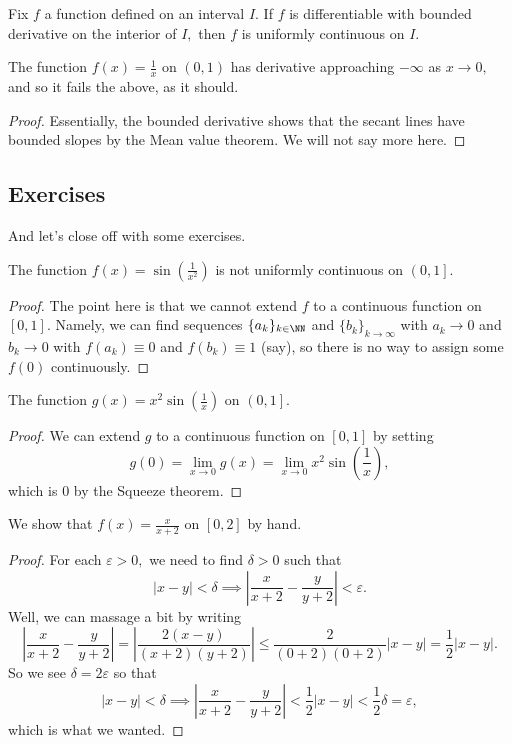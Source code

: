 \documentclass[../notes.tex]{subfiles}
\begin{document}
\begin{proposition}
	Fix $f$ a function defined on an interval $I.$ If $f$ is differentiable with bounded derivative on the interior of $I,$ then $f$ is uniformly continuous on $I.$
\end{proposition}
\begin{nex}
	The function $f(x)=\frac1x$ on $(0,1)$ has derivative approaching $-\infty$ as $x\to0,$ and so it fails the above, as it should.
\end{nex}
\begin{proof}
	Essentially, the bounded derivative shows that the secant lines have bounded slopes by the Mean value theorem. We will not say more here.
\end{proof}

\subsection{Exercises}
And let's close off with some exercises.
\begin{exercise}[Ross 19.1(f)]
	The function $f(x)=\sin\left(\frac1{x^2}\right)$ is not uniformly continuous on $\left(0,1\right].$
\end{exercise}
\begin{proof}
	The point here is that we cannot extend $f$ to a continuous function on $[0,1].$ Namely, we can find sequences $\{a_k\}_{k\in\NN}$ and $\{b_k\}_{k\to\infty}$ with $a_k\to0$ and $b_k\to0$ with $f(a_k)\equiv0$ and $f(b_k)\equiv1$ (say), so there is no way to assign some $f(0)$ continuously.
\end{proof}
\begin{exercise}[Ross 19.1(g)]
	The function $g(x)=x^2\sin\left(\frac1x\right)$ on $\left(0,1\right].$
\end{exercise}
\begin{proof}
	We can extend $g$ to a continuous function on $[0,1]$ by setting
	\[g(0)=\lim_{x\to0}g(x)=\lim_{x\to0}x^2\sin\left(\frac1x\right),\]
	which is $0$ by the Squeeze theorem.
\end{proof}
\begin{exercise}[Ross 19.3(a)]
	We show that $f(x)=\frac x{x+2}$ on $[0,2]$ by hand.
\end{exercise}
\begin{proof}
	For each $\varepsilon>0,$ we need to find $\delta>0$ such that
	\[|x-y|<\delta\implies\left|\frac x{x+2}-\frac y{y+2}\right|<\varepsilon.\]
	Well, we can massage a bit by writing
	\[\left|\frac x{x+2}-\frac y{y+2}\right|=\left|\frac{2(x-y)}{(x+2)(y+2)}\right|\le\frac2{(0+2)(0+2)}|x-y|=\frac12|x-y|.\]
	So we see $\delta=2\varepsilon$ so that
	\[|x-y|<\delta\implies\left|\frac x{x+2}-\frac y{y+2}\right|<\frac12|x-y|<\frac12\delta=\varepsilon,\]
	which is what we wanted.
\end{proof}
\end{document}
